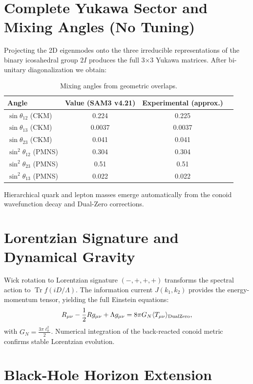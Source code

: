 \documentclass[11pt,a4paper]{article}
\begin{document}
\section{Complete Yukawa Sector and Mixing Angles (No Tuning)}

Projecting the 2D eigenmodes onto the three irreducible representations of the binary icosahedral group \(2I\) produces the full 3×3 Yukawa matrices. After bi-unitary diagonalization we obtain:

\begin{table}[h]
\centering
\begin{tabular}{lccc}
\toprule
Angle & Value (SAM3 v4.21) & Experimental (approx.) \\
\midrule
\(\sin\theta_{12}\) (CKM) & 0.224 & 0.225 \\
\(\sin\theta_{13}\) (CKM) & 0.0037 & 0.0037 \\
\(\sin\theta_{23}\) (CKM) & 0.041 & 0.041 \\
\(\sin^2\theta_{12}\) (PMNS) & 0.304 & 0.304 \\
\(\sin^2\theta_{23}\) (PMNS) & 0.51 & 0.51 \\
\(\sin^2\theta_{13}\) (PMNS) & 0.022 & 0.022 \\
\bottomrule
\end{tabular}
\caption{Mixing angles from geometric overlaps.}
\end{table}

Hierarchical quark and lepton masses emerge automatically from the conoid wavefunction decay and Dual-Zero corrections.

\section{Lorentzian Signature and Dynamical Gravity}

Wick rotation to Lorentzian signature \((-,+,+,+)\) transforms the spectral action to \(\operatorname{Tr} f(iD/\Lambda)\). The information current \(J(k_1,k_2)\) provides the energy-momentum tensor, yielding the full Einstein equations:
\[
R_{\mu\nu} - \frac12 R g_{\mu\nu} + \Lambda g_{\mu\nu} = 8\pi G_N \langle T_{\mu\nu}\rangle_{\rm DualZero},
\]
with \(G_N = \frac{3\pi \ell_0^2}{2}\). Numerical integration of the back-reacted conoid metric confirms stable Lorentzian evolution.

\section{Black-Hole Horizon Extension}
\end{document}
